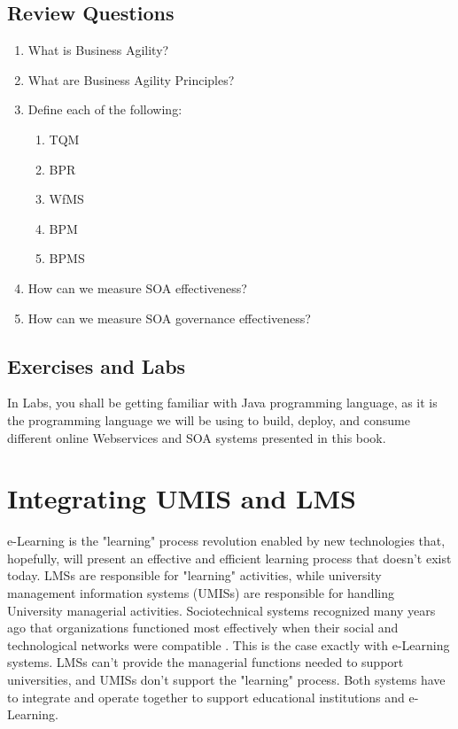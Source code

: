 \documentclass[12pt,a4paper,final,twoside,onecolumn,titlepage]{book}
\begin{document}
\section{Review Questions}
\begin{enumerate}
\item What is Business Agility?
\item What are Business Agility Principles?
\item Define each of the following:
\begin{enumerate}
\item \gls{TQM}
\item \gls{BPR}
\item \gls{WfMS}
\item \gls{BPM}
\item \gls{BPMS}
\end{enumerate}
\item How can we measure SOA effectiveness?
\item How can we measure SOA governance effectiveness?
\end{enumerate}

\section{Exercises and Labs}
In Labs, you shall be getting familiar with Java programming language, as it is the programming language we will be using to build, deploy, and consume different online Webservices and \gls{SOA} systems presented in this book.


\chapter{Integrating UMIS and LMS}
e-Learning is the "learning" process revolution enabled by new technologies that, hopefully, will present an effective and efficient learning process that doesn't exist today. \gls{LMS}s are responsible for "learning" activities, while university management information systems (\gls{UMIS}s) are responsible for handling University managerial activities.
Sociotechnical systems recognized many years ago that organizations functioned most effectively when their social and technological networks were compatible \cite{UMIS55}. This is the case exactly with e-Learning systems. \gls{LMS}s can't provide the managerial functions needed to support universities, and \gls{UMIS}s don't support the "learning" process. Both systems have to integrate and operate together to support educational institutions and e-Learning.
\end{document}
